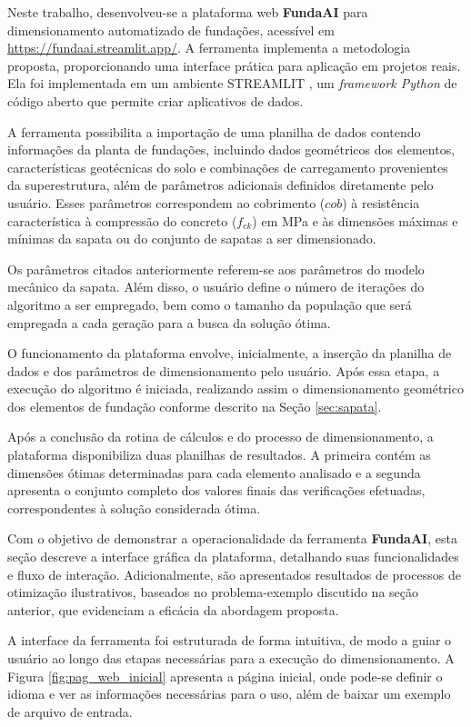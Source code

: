 Neste trabalho, desenvolveu-se a plataforma web \textbf{FundaAI} para dimensionamento automatizado de fundações, acessível em \url{https://fundaai.streamlit.app/}. A ferramenta implementa a metodologia proposta, proporcionando uma interface prática para aplicação em projetos reais. Ela foi implementada em um ambiente \textsc{STREAMLIT} \cite{streamlit2024}, um \textit{framework Python} de código aberto que permite criar aplicativos de dados. 

A ferramenta possibilita a importação de uma planilha de dados contendo informações da planta de fundações, incluindo dados geométricos dos elementos, características geotécnicas do solo e combinações de carregamento provenientes da superestrutura, além de parâmetros adicionais definidos diretamente pelo usuário. Esses parâmetros correspondem ao cobrimento ($cob$) à resistência característica à compressão do concreto ($f_{ck}$) em MPa e às dimensões máximas e mínimas da sapata ou do conjunto de sapatas a ser dimensionado. 

Os parâmetros citados anteriormente referem-se aos parâmetros do modelo mecânico da sapata. Além disso, o usuário define o número de iterações do algoritmo a ser empregado, bem como o tamanho da população que será empregada a cada geração para a busca da solução ótima.

O funcionamento da plataforma envolve, inicialmente, a inserção da planilha de dados e dos parâmetros de dimensionamento pelo usuário. Após essa etapa, a execução do algoritmo é iniciada, realizando assim o dimensionamento geométrico dos elementos de fundação conforme descrito na Seção \ref{sec:sapata}.

Após a conclusão da rotina de cálculos e do processo de dimensionamento, a plataforma disponibiliza duas planilhas de resultados. A primeira contém as dimensões ótimas determinadas para cada elemento analisado e a segunda apresenta o conjunto completo dos valores finais das verificações efetuadas, correspondentes à solução considerada ótima.

Com o objetivo de demonstrar a operacionalidade da ferramenta \textbf{FundaAI}, esta seção descreve a interface gráfica da plataforma, detalhando suas funcionalidades e fluxo de interação. Adicionalmente, são apresentados resultados de processos de otimização ilustrativos, baseados no problema-exemplo discutido na seção anterior, que evidenciam a eficácia da abordagem proposta.

A interface da ferramenta foi estruturada de forma intuitiva, de modo a guiar o usuário ao longo das etapas necessárias para a execução do dimensionamento. A Figura \ref{fig:pag_web_inicial} apresenta a página inicial, onde pode-se definir o idioma e ver as informações necessárias para o uso, além de baixar um exemplo de arquivo de entrada.

